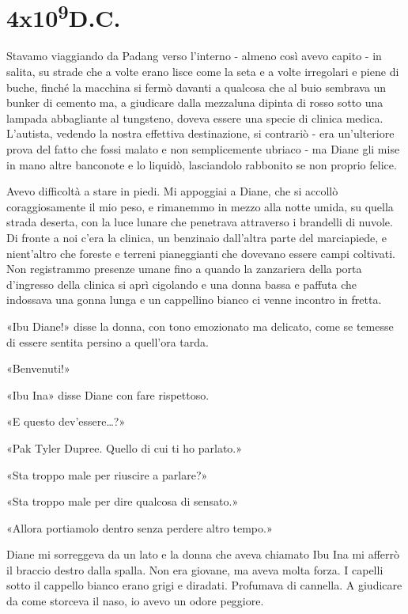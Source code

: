 \chapter{4x10\textsuperscript{9}D.C.}\label{4x10^9-3}

\hfill\break

Stavamo viaggiando da Padang verso l'interno - almeno così avevo capito
- in salita, su strade che a volte erano lisce come la seta e a volte
irregolari e piene di buche, finché la macchina si fermò davanti a
qualcosa che al buio sembrava un bunker di cemento ma, a giudicare dalla
mezzaluna dipinta di rosso sotto una lampada abbagliante al tungsteno,
doveva essere una specie di clinica medica. L'autista, vedendo la nostra
effettiva destinazione, si contrariò - era un'ulteriore prova del fatto
che fossi malato e non semplicemente ubriaco - ma Diane gli mise in mano
altre banconote e lo liquidò, lasciandolo rabbonito se non proprio
felice.

Avevo difficoltà a stare in piedi. Mi appoggiai a Diane, che si accollò
coraggiosamente il mio peso, e rimanemmo in mezzo alla notte umida, su
quella strada deserta, con la luce lunare che penetrava attraverso i
brandelli di nuvole. Di fronte a noi c'era la clinica, un benzinaio
dall'altra parte del marciapiede, e nient'altro che foreste e terreni
pianeggianti che dovevano essere campi coltivati. Non registrammo
presenze umane fino a quando la zanzariera della porta d'ingresso della
clinica si aprì cigolando e una donna bassa e paffuta che indossava una
gonna lunga e un cappellino bianco ci venne incontro in fretta.

«Ibu Diane!» disse la donna, con tono emozionato ma delicato, come se
temesse di essere sentita persino a quell'ora tarda.

«Benvenuti!»

«Ibu Ina» disse Diane con fare rispettoso.

«E questo dev'essere\ldots?»

«Pak Tyler Dupree. Quello di cui ti ho parlato.»

«Sta troppo male per riuscire a parlare?»

«Sta troppo male per dire qualcosa di sensato.»

«Allora portiamolo dentro senza perdere altro tempo.»

Diane mi sorreggeva da un lato e la donna che aveva chiamato Ibu Ina mi
afferrò il braccio destro dalla spalla. Non era giovane, ma aveva molta
forza. I capelli sotto il cappello bianco erano grigi e diradati.
Profumava di cannella. A giudicare da come storceva il naso, io avevo un
odore peggiore.

